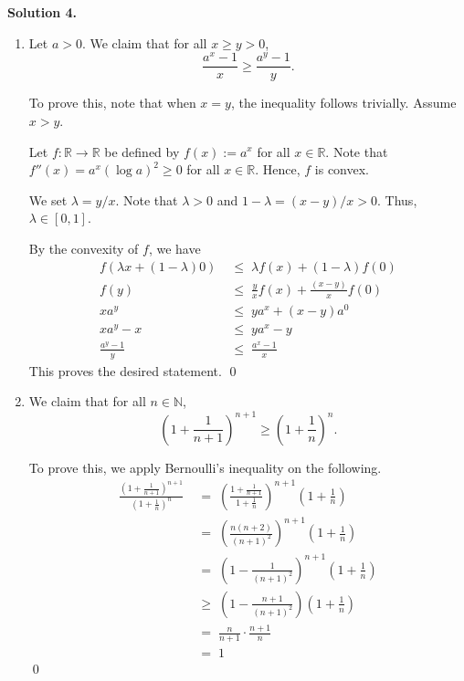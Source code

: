 \documentclass[10pt]{article}
\begin{document}
        \textbf{Solution 4.}
        \begin{enumerate}
                \item Let $a > 0$. We claim that for all $x \ge y > 0$,
                \[ \frac{a^x - 1}{x} \ge \frac{a^y - 1}{y}. \]

                To prove this, note that when $x = y$, the inequality follows trivially. Assume $x > y$.

                Let $f\colon \mathbb{R} \to \mathbb{R}$ be defined by $f(x) := a^x$ for all $x \in \mathbb{R}$.
                Note that $f''(x) = a^x (\log{a})^2 \ge 0$ for all $x \in \mathbb{R}$. Hence, $f$ is convex.

                We set $\lambda = y/x$. Note that $\lambda > 0$ and $1 - \lambda = (x - y) / x > 0$. Thus, $\lambda \in [0, 1]$.

                By the convexity of $f$, we have
                \begin{align*}
                        f(\lambda x + (1 - \lambda) 0) \;&\le\; \lambda f(x) + (1 - \lambda) f(0) \\
                        f(y) \;&\le\; \frac{y}{x}f(x) + \frac{(x - y)}{x} f(0) \\
                        x a^y \;&\le\; y a^x + (x - y) a^0 \\
                        x a^y - x \;&\le\; y a^x - y \\
                        \frac{a^y - 1}{y} \;&\le\; \frac{a^x - 1}{x}
                \end{align*}
                This proves the desired statement. \qed\\

                \item We claim that for all $n \in \mathbb{N}$,
                \[\left(1 + \frac{1}{n + 1}\right)^{n + 1} \ge \left(1 + \frac{1}{n}\right)^{n}.\]

                To prove this, we apply Bernoulli's inequality on the following.
                \begin{align*}
                \frac{\left(1 + \frac{1}{n + 1}\right)^{n+1}}{\left(1 + \frac{1}{n}\right)^n}
                        \;&=\; \left(\frac{1 + \frac{1}{n + 1}}{1 + \frac{1}{n}}\right)^{n+1}\left(1 + \frac{1}{n}\right) \\
                        \;&=\; \left(\frac{n(n+2)}{(n+1)^2}\right)^{n+1}\left(1 + \frac{1}{n}\right) \\
                        \;&=\; \left(1 - \frac{1}{(n+1)^2}\right)^{n+1}\left(1 + \frac{1}{n}\right) \\
                        \;&\ge\; \left(1 - \frac{n+1}{(n+1)^2}\right)\left(1 + \frac{1}{n}\right) \\
                        \;&=\; \frac{n}{n+1}\cdot\frac{n+1}{n} \\
                        \;&=\; 1
                \end{align*}\qed
        \end{enumerate}
\end{document}
